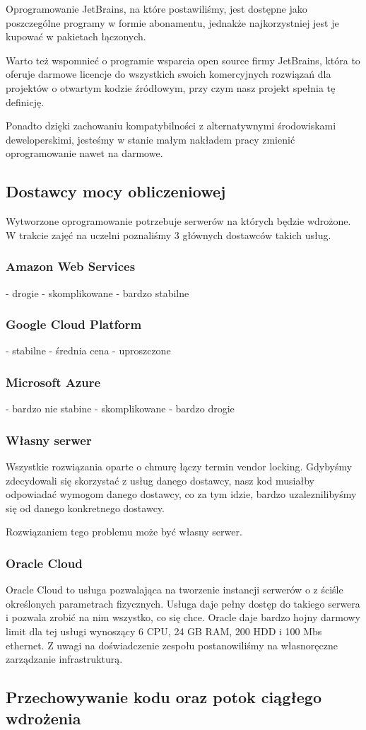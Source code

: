 Oprogramowanie JetBrains, na które postawiliśmy, jest dostępne jako poszczególne programy w formie abonamentu, jednakże najkorzystniej jest je kupować w pakietach łączonych.


Warto też wspomnieć o programie wsparcia open source firmy JetBrains, która to oferuje darmowe licencje do wszystkich swoich komercyjnych rozwiązań dla projektów o otwartym kodzie źródłowym, przy czym nasz projekt spełnia tę definicję.


Ponadto dzięki zachowaniu kompatybilności z alternatywnymi środowiskami deweloperskimi, jesteśmy w stanie małym nakładem pracy zmienić oprogramowanie nawet na darmowe.

\subsection{Dostawcy mocy obliczeniowej}
\label{subsec:dostawcy-mocy-obliczeniowej}
Wytworzone oprogramowanie potrzebuje serwerów na których będzie wdrożone.
W trakcie zajęć na uczelni poznaliśmy 3 głównych dostawców takich usług.

\subsubsection{Amazon Web Services}
- drogie
- skomplikowane
- bardzo stabilne
\subsubsection{Google Cloud Platform}
- stabilne
- średnia cena
- uproszczone
\subsubsection{Microsoft Azure}
- bardzo nie stabine
- skomplikowane
- bardzo drogie

\subsubsection{Własny serwer}
Wszystkie rozwiązania oparte o chmurę łączy termin vendor locking.
Gdybyśmy zdecydowali się skorzystać z usług danego dostawcy, nasz kod musiałby odpowiadać wymogom danego dostawcy, co za tym idzie, bardzo uzaleznilibyśmy się od danego konkretnego dostawcy.

Rozwiązaniem tego problemu może być własny serwer.
\subsubsection{Oracle Cloud}
Oracle Cloud to usługa pozwalająca na tworzenie instancji  serwerów o z ściśle określonych parametrach fizycznych.
Usługa daje pełny dostęp do takiego serwera i pozwala zrobić na nim wszystko, co się chce.
Oracle daje bardzo hojny darmowy limit dla tej usługi wynoszący 6 CPU, 24 GB RAM, 200 HDD i 100 Mbs ethernet.
Z uwagi na doświadczenie zespołu postanowiliśmy na własnoręczne zarządzanie infrastrukturą.

\subsection{Przechowywanie kodu oraz potok ciągłego wdrożenia}
\label{subsec:przechowywanie-kodu-oraz-potok-ciagego-wdrozenia}
